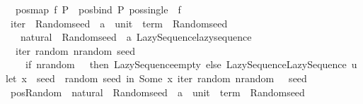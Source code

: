 \begin{isabellebody}
\isanewline
\ \ {\isachardoublequoteopen}pos{\isacharunderscore}{\kern0pt}map\ f\ P\ {\isacharequal}{\kern0pt}\ pos{\isacharunderscore}{\kern0pt}bind\ P\ {\isacharparenleft}{\kern0pt}pos{\isacharunderscore}{\kern0pt}single\ {\isasymcirc}\ f{\isacharparenright}{\kern0pt}{\isachardoublequoteclose}\isanewline
\isanewline
{}\isamarkupfalse%
\ iter\ {\isacharcolon}{\kern0pt}{\isacharcolon}{\kern0pt}\ {\isachardoublequoteopen}{\isacharparenleft}{\kern0pt}Random{\isachardot}{\kern0pt}seed\ {\isasymRightarrow}\ {\isacharparenleft}{\kern0pt}{\isacharprime}{\kern0pt}a\ {\isasymtimes}\ {\isacharparenleft}{\kern0pt}unit\ {\isasymRightarrow}\ term{\isacharparenright}{\kern0pt}{\isacharparenright}{\kern0pt}\ {\isasymtimes}\ Random{\isachardot}{\kern0pt}seed{\isacharparenright}{\kern0pt}\isanewline
\ \ {\isasymRightarrow}\ natural\ {\isasymRightarrow}\ Random{\isachardot}{\kern0pt}seed\ {\isasymRightarrow}\ {\isacharprime}{\kern0pt}a\ Lazy{\isacharunderscore}{\kern0pt}Sequence{\isachardot}{\kern0pt}lazy{\isacharunderscore}{\kern0pt}sequence{\isachardoublequoteclose}\isanewline
{}\isanewline
\ \ {\isachardoublequoteopen}iter\ random\ nrandom\ seed\ {\isacharequal}{\kern0pt}\isanewline
\ \ \ \ {\isacharparenleft}{\kern0pt}if\ nrandom\ {\isacharequal}{\kern0pt}\ {}\ then\ Lazy{\isacharunderscore}{\kern0pt}Sequence{\isachardot}{\kern0pt}empty\ else\ Lazy{\isacharunderscore}{\kern0pt}Sequence{\isachardot}{\kern0pt}Lazy{\isacharunderscore}{\kern0pt}Sequence\ {\isacharparenleft}{\kern0pt}{\isacharpercent}{\kern0pt}u{\isachardot}{\kern0pt}\ let\ {\isacharparenleft}{\kern0pt}{\isacharparenleft}{\kern0pt}x{\isacharcomma}{\kern0pt}\ {\isacharunderscore}{\kern0pt}{\isacharparenright}{\kern0pt}{\isacharcomma}{\kern0pt}\ seed{\isacharprime}{\kern0pt}{\isacharparenright}{\kern0pt}\ {\isacharequal}{\kern0pt}\ random\ seed\ in\ Some\ {\isacharparenleft}{\kern0pt}x{\isacharcomma}{\kern0pt}\ iter\ random\ {\isacharparenleft}{\kern0pt}nrandom\ {\isacharminus}{\kern0pt}\ {}{\isacharparenright}{\kern0pt}\ seed{\isacharprime}{\kern0pt}{\isacharparenright}{\kern0pt}{\isacharparenright}{\kern0pt}{\isacharparenright}{\kern0pt}{\isachardoublequoteclose}\isanewline
\isanewline
{}\isamarkupfalse%
\ pos{\isacharunderscore}{\kern0pt}Random\ {\isacharcolon}{\kern0pt}{\isacharcolon}{\kern0pt}\ {\isachardoublequoteopen}{\isacharparenleft}{\kern0pt}natural\ {\isasymRightarrow}\ Random{\isachardot}{\kern0pt}seed\ {\isasymRightarrow}\ {\isacharparenleft}{\kern0pt}{\isacharprime}{\kern0pt}a\ {\isasymtimes}\ {\isacharparenleft}{\kern0pt}unit\ {\isasymRightarrow}\ term{\isacharparenright}{\kern0pt}{\isacharparenright}{\kern0pt}\ {\isasymtimes}\ Random{\isachardot}{\kern0pt}seed{\isacharparenright}{\kern0pt}\isanewline

\end{isabellebody}

